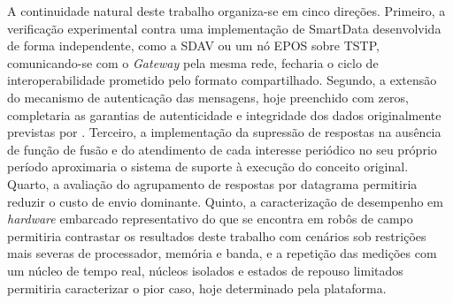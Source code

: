 \documentclass[
    12pt,
    oneside,
    a4paper,
    chapter=TITLE,
    section=TITLE,
    english,
    brazil
]{abntex2}
\begin{document}
A continuidade natural deste trabalho organiza-se em cinco direções.
Primeiro, a verificação experimental contra uma implementação de
SmartData desenvolvida de forma independente, como a SDAV ou um nó EPOS
sobre TSTP, comunicando-se com o \textit{Gateway} pela mesma rede,
fecharia o ciclo de interoperabilidade prometido pelo formato
compartilhado. Segundo, a extensão do mecanismo de autenticação das
mensagens, hoje preenchido com zeros, completaria as garantias de
autenticidade e integridade dos dados originalmente previstas por
. Terceiro, a implementação da
supressão de respostas na ausência de função de fusão e do atendimento de
cada interesse periódico no seu próprio período aproximaria o sistema de
suporte à execução do conceito original. Quarto, a avaliação do
agrupamento de respostas por datagrama permitiria reduzir o custo de
envio dominante. Quinto, a caracterização de desempenho em
\textit{hardware} embarcado representativo do que se encontra em robôs de
campo permitiria contrastar os resultados deste trabalho com cenários sob
restrições mais severas de processador, memória e banda, e a repetição
das medições com um núcleo de tempo real, núcleos isolados e estados de
repouso limitados permitiria caracterizar o pior caso, hoje determinado
pela plataforma.
\postextual


\end{document}
